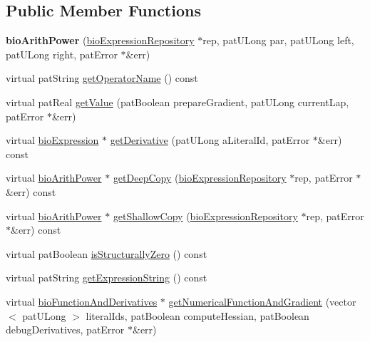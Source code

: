\subsection*{Public Member Functions}
\begin{DoxyCompactItemize}
\item 
\mbox{\label{classbio_arith_power_ab5ce5ffc905627f20005fbf5d5c98575}} 
{\bfseries bio\+Arith\+Power} (\hyperlink{classbio_expression_repository}{bio\+Expression\+Repository} $\ast$rep, pat\+U\+Long par, pat\+U\+Long left, pat\+U\+Long right, pat\+Error $\ast$\&err)
\item 
virtual pat\+String \hyperlink{classbio_arith_power_a7edb8072b2c5aef093244305fbc76962}{get\+Operator\+Name} () const
\item 
virtual pat\+Real \hyperlink{classbio_arith_power_a3274071fcc8f58adb67b82880e178842}{get\+Value} (pat\+Boolean prepare\+Gradient, pat\+U\+Long current\+Lap, pat\+Error $\ast$\&err)
\item 
virtual \hyperlink{classbio_expression}{bio\+Expression} $\ast$ \hyperlink{classbio_arith_power_accc8e782d664f92db194ef1dc5a19e4b}{get\+Derivative} (pat\+U\+Long a\+Literal\+Id, pat\+Error $\ast$\&err) const
\item 
virtual \hyperlink{classbio_arith_power}{bio\+Arith\+Power} $\ast$ \hyperlink{classbio_arith_power_abad616d9928debfc78b8b8ecd1f0d9bd}{get\+Deep\+Copy} (\hyperlink{classbio_expression_repository}{bio\+Expression\+Repository} $\ast$rep, pat\+Error $\ast$\&err) const
\item 
virtual \hyperlink{classbio_arith_power}{bio\+Arith\+Power} $\ast$ \hyperlink{classbio_arith_power_a1a95ae563759a44ffb29b42c82209f90}{get\+Shallow\+Copy} (\hyperlink{classbio_expression_repository}{bio\+Expression\+Repository} $\ast$rep, pat\+Error $\ast$\&err) const
\item 
virtual pat\+Boolean \hyperlink{classbio_arith_power_a65021bc0ae804520ac1e64c665abc62a}{is\+Structurally\+Zero} () const
\item 
virtual pat\+String \hyperlink{classbio_arith_power_a90e7e9f398760b8c8f928ecfb7d7c3d3}{get\+Expression\+String} () const
\item 
virtual \hyperlink{classbio_function_and_derivatives}{bio\+Function\+And\+Derivatives} $\ast$ \hyperlink{classbio_arith_power_a21f939e2e8554c6ae153be6bdc873b1a}{get\+Numerical\+Function\+And\+Gradient} (vector$<$ pat\+U\+Long $>$ literal\+Ids, pat\+Boolean compute\+Hessian, pat\+Boolean debug\+Derivatives, pat\+Error $\ast$\&err)
\end{DoxyCompactItemize}
